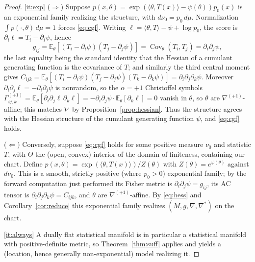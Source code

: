 \documentclass{amsart}
\theoremstyle{definition}
\theoremstyle{remark}
\begin{document}
\begin{proof}
\eqref{it:exp} ($\Rightarrow$) Suppose $p(x,\theta)=\exp(\langle\theta,T(x)
\rangle-\psi(\theta))p_{0}(x)$ is an exponential family realizing the structure,
with $d\nu_{0}=p_{0}\,d\mu$. Normalization $\int p(\cdot,\theta)\,d\mu=1$ forces
\eqref{eq:cgf}. Writing $\ell=\langle\theta,T\rangle-\psi+\log p_{0}$, the score is
$\partial_{i}\ell=T_{i}-\partial_{i}\psi$, hence
\[
  g_{ij}=\mathbb E_{\theta}[(T_{i}-\partial_{i}\psi)(T_{j}-\partial_{j}\psi)]
        =\operatorname{Cov}_{\theta}(T_{i},T_{j})=\partial_{i}\partial_{j}\psi,
\]
the last equality being the standard identity that the Hessian of a cumulant
generating function is the covariance of $T$; and similarly the third central
moment gives $C_{ijk}=\mathbb E_{\theta}[(T_{i}-\partial_{i}\psi)(T_{j}-
\partial_{j}\psi)(T_{k}-\partial_{k}\psi)]=\partial_{i}\partial_{j}\partial_{k}
\psi$. Moreover $\partial_{i}\partial_{j}\ell=-\partial_{i}\partial_{j}\psi$ is
nonrandom, so the $\alpha=+1$ Christoffel symbols
$\Gamma^{(+1)}_{ij,k}=\mathbb E_{\theta}[\partial_{i}\partial_{j}\ell\,
\partial_{k}\ell]=-\partial_{i}\partial_{j}\psi\cdot\mathbb E_{\theta}[\partial_{k}
\ell]=0$ vanish in $\theta$, so $\theta$ are $\nabla^{(+1)}$-affine; this matches
$\nabla$ by Proposition~\ref{prop:hessian}. Thus the structure agrees with the
Hessian structure of the cumulant generating function $\psi$, and \eqref{eq:cgf}
holds.

($\Leftarrow$) Conversely, suppose \eqref{eq:cgf} holds for some positive measure
$\nu_{0}$ and statistic $T$, with $\Theta$ the (open, convex) interior of the
domain of finiteness, containing our chart. Define $p(x,\theta)=
\exp(\langle\theta,T(x)\rangle)/Z(\theta)$ with $Z(\theta)=e^{\psi(\theta)}$
against $d\nu_{0}$. This is a smooth, strictly positive (where $p_{0}>0$)
exponential family; by the forward computation just performed its Fisher metric
is $\partial_{i}\partial_{j}\psi=g_{ij}$, its AC tensor is
$\partial_{i}\partial_{j}\partial_{k}\psi=C_{ijk}$, and $\theta$ are
$\nabla^{(+1)}$-affine. By \eqref{eq:hess} and Corollary~\ref{cor:reduce} this
exponential family realizes $(M,g,\nabla,\nabla^{*})$ on the chart.

\eqref{it:always} A dually flat statistical manifold is in particular a
statistical manifold with positive-definite metric, so Theorem~\ref{thm:suff}
applies and yields a (location, hence generally non-exponential) model realizing
it.


\end{proof}
\end{document}
